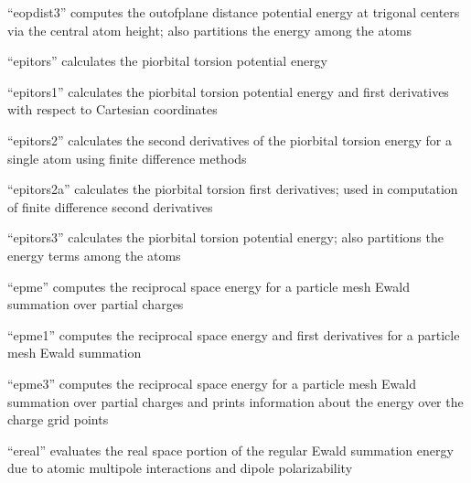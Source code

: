 \documentclass[letterpaper,11pt,english]{sphinxmanual}
\begin{document}

“eopdist3” computes the out\sphinxhyphen{}of\sphinxhyphen{}plane distance potential energy at trigonal centers via the central atom height; also partitions the energy among the atoms


“epitors” calculates the pi\sphinxhyphen{}orbital torsion potential energy


“epitors1” calculates the pi\sphinxhyphen{}orbital torsion potential energy and first derivatives with respect to Cartesian coordinates


“epitors2” calculates the second derivatives of the pi\sphinxhyphen{}orbital torsion energy for a single atom using finite difference methods


“epitors2a” calculates the pi\sphinxhyphen{}orbital torsion first derivatives; used in computation of finite difference second derivatives


“epitors3” calculates the pi\sphinxhyphen{}orbital torsion potential energy; also partitions the energy terms among the atoms


“epme” computes the reciprocal space energy for a particle mesh Ewald summation over partial charges


“epme1” computes the reciprocal space energy and first derivatives for a particle mesh Ewald summation


“epme3” computes the reciprocal space energy for a particle mesh Ewald summation over partial charges and prints information about the energy over the charge grid points



“ereal” evaluates the real space portion of the regular Ewald summation energy due to atomic multipole interactions and dipole polarizability
\end{document}
